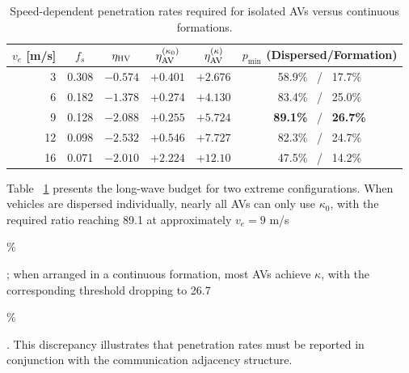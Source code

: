 \documentclass[11pt,a4paper,openany]{book}
\numberwithin{equation}{chapter}
\numberwithin{figure}{chapter}
\numberwithin{table}{chapter}
\begin{document}
\begin{table}[htbp]
\centering
\caption{Speed-dependent penetration rates required for isolated AVs versus continuous formations.}
\label{tab:dispersed-versus-grouped-pmin}
\begin{tabular}{rccccc}
\toprule
$v_e$ [m/s] & $f_s$ & $\eta_{\rm HV}$ & $\eta_{\rm AV}^{(\kappa_0)}$ & $\eta_{\rm AV}^{(\kappa)}$ &




$p_{\min}$ (Dispersed/Formation)



\\
\midrule
3  & 0.308 & $-0.574$ & $+0.401$ & $+2.676$ & 58.9\% \ / \ 17.7\% \\
6  & 0.182 & $-1.378$ & $+0.274$ & $+4.130$ & 83.4\% \ / \ 25.0\% \\
9  & 0.128 & $-2.088$ & $+0.255$ & $+5.724$ & \textbf{89.1\%} \ / \ \textbf{26.7\%} \\
12 & 0.098 & $-2.532$ & $+0.546$ & $+7.727$ & 82.3\% \ / \ 24.7\% \\
16 & 0.071 & $-2.010$ & $+2.224$ & $+12.10$ & 47.5\% \ / \ 14.2\% \\
\bottomrule
\end{tabular}
\end{table}










Table ~\ref{tab:dispersed-versus-grouped-pmin} presents the long-wave budget for two extreme configurations. When vehicles are dispersed individually, nearly all AVs can only use $\kappa_0$, with the required ratio reaching 89.1 at approximately $v_e=9$ m/s




\%




; when arranged in a continuous formation, most AVs achieve $\kappa$, with the corresponding threshold dropping to 26.7




\%




. This discrepancy illustrates that penetration rates must be reported in conjunction with the communication adjacency structure.
\end{document}
